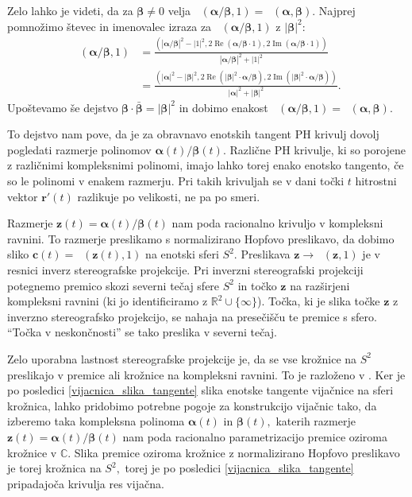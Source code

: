 \documentclass[12pt,a4paper,twoside]{article}
\theoremstyle{definition} %
\theoremstyle{plain} %
\theoremstyle{primerstyle}
\numberwithin{equation}{section}  %
\newcommand{\R}{\mathbb R}
\renewcommand{\C}{\mathbb C}
\newcommand{\cV}{\mathbf{c}}
\newcommand{\rV}{\mathbf{r}}
\newcommand{\zV}{\mathbf{z}}
\newcommand{\balpha}{\boldsymbol \alpha}
\newcommand{\bbeta}{\boldsymbol \beta}
\DeclareMathOperator{\ReC}{Re}
\DeclareMathOperator{\ImC}{Im}
\DeclareMathOperator{\nhopf}{\hat{H}}
\begin{document}
Zelo lahko je videti, da za $\bbeta\neq0$ velja $\nhopf(\balpha/\bbeta,1)=\nhopf(\balpha,\bbeta).$ Najprej pomnožimo števec in imenovalec izraza za $\nhopf(\balpha/\bbeta,1)$ z $|\bbeta|^2$:
\begin{align*}
	\nhopf\left(\balpha/\bbeta,1\right)&=\frac{(|\balpha/\bbeta|^2-|1|^2,2\ReC(\balpha/\bbeta\cdot 1),2\ImC(\balpha/\bbeta\cdot 1))}{|\balpha/\bbeta|^2+|1|^2}\\
	&=\frac{(|\balpha|^2-|\bbeta|^2,2\ReC(|\bbeta|^2\cdot\balpha/\bbeta),2\ImC(|\bbeta|^2\cdot\balpha/\bbeta))}{|\balpha|^2+|\bbeta|^2}.
\end{align*}
Upoštevamo še dejstvo $\bbeta\cdot\bar{\bbeta}=|\bbeta|^2$ in dobimo enakost $\nhopf(\balpha/\bbeta,1)=\nhopf(\balpha,\bbeta).$

To dejstvo nam pove, da je za obravnavo enotskih tangent PH krivulj dovolj pogledati razmerje polinomov $\balpha(t)/\bbeta(t).$ Različne PH krivulje, ki so porojene z različnimi kompleksnimi polinomi, imajo lahko torej enako enotsko tangento, če so le polinomi v enakem razmerju. Pri takih krivuljah se v dani točki $t$ hitrostni vektor $\rV'(t)$ razlikuje po velikosti, ne pa po smeri.

Razmerje $\zV(t)=\balpha(t)/\bbeta(t)$ nam poda racionalno krivuljo v kompleksni ravnini. To razmerje preslikamo s normalizirano Hopfovo preslikavo, da dobimo sliko $\cV(t)=\nhopf(\zV(t),1)$ na enotski sferi $S^2.$ Preslikava $\zV\to\nhopf(\zV,1)$ je v resnici inverz stereografske projekcije. Pri inverzni stereografski projekciji potegnemo premico skozi severni tečaj sfere $S^2$ in točko $\zV$ na razširjeni kompleksni ravnini (ki jo identificiramo z $\R^2\cup\{\infty\}$). Točka, ki je slika točke $\zV$ z inverzno stereografsko projekcijo, se nahaja na presečišču te premice s sfero. ``Točka v neskončnosti'' se tako preslika v severni tečaj.

Zelo uporabna lastnost stereografske projekcije je, da se vse krožnice na $S^2$ preslikajo v premice ali krožnice na kompleksni ravnini. To je razloženo v \cite[pogl.\ ``Stereographic projection'']{needham1998visual}. Ker je po posledici \ref{vijacnica_slika_tangente} slika enotske tangente vijačnice na sferi krožnica, lahko pridobimo potrebne pogoje za konstrukcijo vijačnic tako, da izberemo taka kompleksna polinoma $\balpha(t)$ in $\bbeta(t),$ katerih razmerje $\zV(t)=\balpha(t)/\bbeta(t)$ nam poda racionalno parametrizacijo premice oziroma krožnice v $\C.$ Slika premice oziroma krožnice z normalizirano Hopfovo preslikavo je torej krožnica na $S^2,$ torej je po posledici \ref{vijacnica_slika_tangente} pripadajoča krivulja res vijačna.
\end{document}
